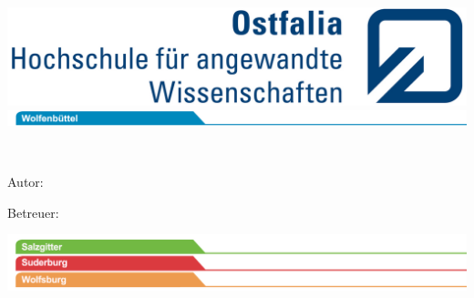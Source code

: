 \frontmatter
\begin{titlepage}
	\setcounter{page}{-100000}
	\vspace*{-1cm}
	
	\hspace{6.90cm}
	\includegraphics[scale=0.93]{Bilder/ostfalia_logo.jpg}\\
	
	\hspace{-1.00cm}
	\includegraphics[scale=1.20]{Bilder/reiter_wf_174mm.jpg}\\
	
	
	\vfil
	\hrulefill
	
	
	{\Large\textbf{\textsf{\documentsubject}}}
	
	\vspace{2em}
	
	{\Huge\textbf{\textsf{\documenttitle}}}
	
	\vspace{2em}
	
	{\Large\textsf{\documentsubtitle}}
	
	\hrulefill\\
	
	
	\vfil
	
	{\Large\textsf{Autor: \documentauthor}}
	
	\vspace{1em}
	
	{\Large\textsf{Betreuer: \documenttutor}}
	
	\vspace{2em}
	
	
	\enlargethispage{10\baselineskip}
	
	\hspace*{-1.00cm}\includegraphics[scale=1.20]{Bilder/reiter_szsudwob_174mm.jpg}
	\vspace*{2cm}
	
	
\end{titlepage}